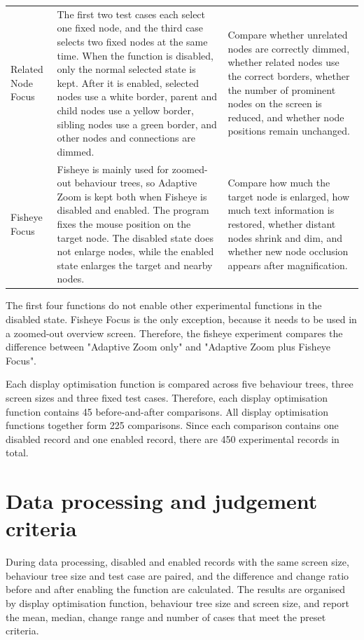 \documentclass[11pt,a4paper,oneside,extrafontsizes]{memoir}
\begin{document}
\begin{center}
\begin{longtable}{@{}p{} p{} p{}@{}}
Related Node Focus & The first two test cases each select one fixed node, and the third case selects two fixed nodes at the same time. When the function is disabled, only the normal selected state is kept. After it is enabled, selected nodes use a white border, parent and child nodes use a yellow border, sibling nodes use a green border, and other nodes and connections are dimmed. & Compare whether unrelated nodes are correctly dimmed, whether related nodes use the correct borders, whether the number of prominent nodes on the screen is reduced, and whether node positions remain unchanged. \\
Fisheye Focus & Fisheye is mainly used for zoomed-out behaviour trees, so Adaptive Zoom is kept both when Fisheye is disabled and enabled. The program fixes the mouse position on the target node. The disabled state does not enlarge nodes, while the enabled state enlarges the target and nearby nodes. & Compare how much the target node is enlarged, how much text information is restored, whether distant nodes shrink and dim, and whether new node occlusion appears after magnification. \\
\bottomrule
\end{longtable}
\end{center}

The first four functions do not enable other experimental functions in the disabled state. Fisheye Focus is the only exception, because it needs to be used in a zoomed-out overview screen. Therefore, the fisheye experiment compares the difference between "Adaptive Zoom only" and "Adaptive Zoom plus Fisheye Focus".

Each display optimisation function is compared across five behaviour trees, three screen sizes and three fixed test cases. Therefore, each display optimisation function contains 45 before-and-after comparisons. All display optimisation functions together form 225 comparisons. Since each comparison contains one disabled record and one enabled record, there are 450 experimental records in total.

\section{Data processing and judgement criteria}

During data processing, disabled and enabled records with the same screen size, behaviour tree size and test case are paired, and the difference and change ratio before and after enabling the function are calculated. The results are organised by display optimisation function, behaviour tree size and screen size, and report the mean, median, change range and number of cases that meet the preset criteria.
\end{document}
